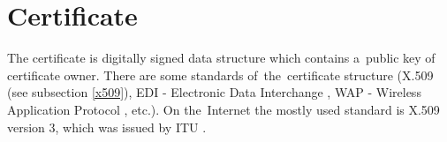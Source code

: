 \documentclass[
  oneside, 12pt, 
  printed, %
  notable,   %
  nolof,     %
  nolot,     %
]{fithesis3}
\begin{document}

\section{Certificate}
The certificate is digitally signed data structure which contains a~public key of certificate 
owner. There are some standards of~the~certificate structure (X.509 (see subsection \ref{x509}), 
EDI - Electronic Data Interchange \cite{edi}, WAP - Wireless Application Protocol 
\cite{sharma2003wireless}, etc.). On the~Internet the mostly used standard is X.509 version 3, 
which was issued by ITU \cite{dostalek2016velky}. %
\end{document}
